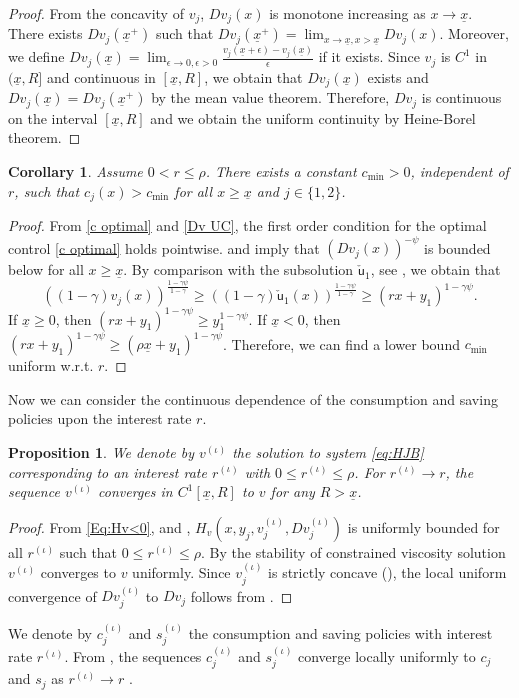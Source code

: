 \documentclass[11pt]{article}
\numberwithin{equation}{section}
\newtheorem{prop}[thm]{Proposition}
\newtheorem{cor}[thm]{Corollary}
\theoremstyle{definition}
\def\su{{\mathsf{u}}}
\def\i{{(\iota)}}
\newcommand{\ux}{{\underline x}}
\newcommand{\g}{\gamma}
\newcommand{\p}{\psi}
\theoremstyle{plain}
\begin{document}
\begin{proof}
From the concavity of $v_j$, $Dv_j(x)$ is monotone increasing as $x\to \ux$. There exists $Dv_j(\ux^+)$ such that $Dv_j(\ux^+)=\lim_{x\to \ux,x>\ux}Dv_j(x)$. Moreover, we define $Dv_j(\ux)=\lim_{\epsilon \to 0,\epsilon>0}\frac{v_j(\ux+\epsilon)-v_j(\ux)}{\epsilon}$ if it exists. Since $v_j$ is $C^1$ in $(\ux,R]$ and continuous in $[\ux,R]$, we obtain that $Dv_j(\ux)$ exists and $Dv_j(\ux)=Dv_j(\ux^+)$ {}{by the mean value theorem}. Therefore, $Dv_j$ is continuous on the interval $[\ux,R]$ and we obtain the uniform continuity by Heine-Borel theorem. 
\end{proof}

\begin{cor}\label{col: c min}
Assume $0<r\leq \rho$. There exists a constant $c_{\min}>0$, independent of $r$, such that $c_j(x)>c_{\min}$ for all $x\geq \ux$ and $j\in \{1,2\}$.  
\end{cor}
\begin{proof}
From \eqref{c optimal} and {}{\cref{Dv UC}}, the first order condition for the optimal control \eqref{c optimal} holds 
 pointwise.  and  imply that $(Dv_j(x))^{-\p}$ is bounded below for all $x\geq \ux$. By comparison with the subsolution $\check{\su}_1$, see , we obtain that
 $$
 ((1-\g)v_j(x))^{\frac{1-\g \p}{1-\g}}\geq ((1-\g)\check{\su}_1(x))^{\frac{1-\g \p}{1-\g}}\geq (rx+y_1)^{1-\g \p}.
 $$
 If $\ux\geq 0$, then $(rx+y_1)^{1-\g \p}\geq y_1^{1-\g \p}$. If $\ux< 0$, then $(rx+y_1)^{1-\g \p}\geq (\rho \ux+y_1)^{1-\g \p}$. Therefore, we can find a lower bound $c_{\min}$ uniform w.r.t. $r$. 
\end{proof}
Now we can consider the continuous dependence of the consumption and saving policies upon the interest rate $r$. 
\begin{prop}\label{Prop: stability r}
We denote by $v^\i$ the solution to system \eqref{eq:HJB} corresponding to an interest rate $r^\i$ with $0\leq r^\i\leq \rho$. For $r^\i \to r$, the sequence $v^\i$ converges in $C^1[\ux,R]$ to $v$ for any $R>\ux$. 
\end{prop}
\begin{proof}
From \eqref{Eq:Hv<0},  and , $H_v(x,y_j,v^\i_j,Dv^\i_j)$ is uniformly bounded for all $r^\i$ such that $0\leq r^\i\leq \rho$. By the stability of constrained viscosity solution $v^\i$ converges to $v$ uniformly. Since $v_j^\i$ is strictly concave (), the local uniform convergence of $D v^\i_j$ to $Dv_j$ follows from . 
\end{proof}
We denote by $c_j^{\i}$ and $s_j^{\i}$ the consumption and saving policies with interest rate $r^\i$. From , the sequences $c_j^{\i}$ and $s_j^{\i}$ converge locally uniformly to $c_j$ and $s_j$ as $r^\i\to r$ .
\end{document}
